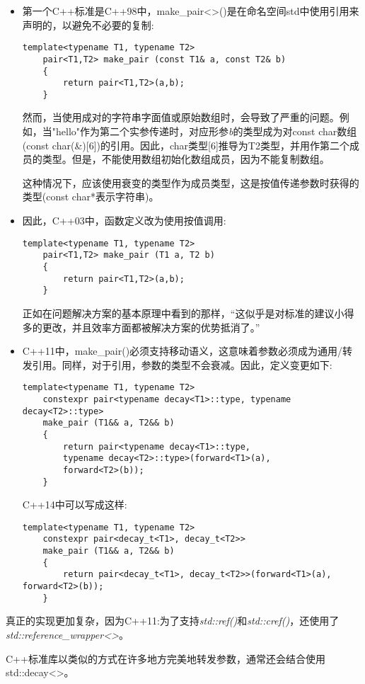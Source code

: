 \begin{itemize}
	\item 第一个C++标准是C++98中，make\_pair<>()是在命名空间std中使用引用来声明的，以避免不必要的复制:
	\begin{lstlisting}[caption={}]
	template<typename T1, typename T2>
	pair<T1,T2> make_pair (const T1& a, const T2& b)
	{
		return pair<T1,T2>(a,b);
	}
	\end{lstlisting}
	然而，当使用成对的字符串字面值或原始数组时，会导致了严重的问题。例如，当"hello"作为第二个实参传递时，对应形参\textit{b}的类型成为对const char数组(const char(\&)[6])的引用。因此，char类型[6]推导为T2类型，并用作第二个成员的类型。但是，不能使用数组初始化数组成员，因为不能复制数组。\par
	这种情况下，应该使用衰变的类型作为成员类型，这是按值传递参数时获得的类型(const char*表示字符串)。
	
	\item 因此，C++03中，函数定义改为使用按值调用:
	\begin{lstlisting}[caption={}]
	template<typename T1, typename T2>
	pair<T1,T2> make_pair (T1 a, T2 b)
	{
		return pair<T1,T2>(a,b);
	}
	\end{lstlisting}
	正如在问题解决方案的基本原理中看到的那样，“这似乎是对标准的建议小得多的更改，并且效率方面都被解决方案的优势抵消了。”
	
	\item C++11中，make\_pair()必须支持移动语义，这意味着参数必须成为通用/转发引用。同样，对于引用，参数的类型不会衰减。因此，定义变更如下:
	\begin{lstlisting}[caption={}]
	template<typename T1, typename T2>
	constexpr pair<typename decay<T1>::type, typename decay<T2>::type>
	make_pair (T1&& a, T2&& b)
	{
		return pair<typename decay<T1>::type,
		typename decay<T2>::type>(forward<T1>(a),
		forward<T2>(b));
	}
	\end{lstlisting}
	C++14中可以写成这样:
	\begin{lstlisting}[caption={}]
	template<typename T1, typename T2>
	constexpr pair<decay_t<T1>, decay_t<T2>>
	make_pair (T1&& a, T2&& b)
	{
		return pair<decay_t<T1>, decay_t<T2>>(forward<T1>(a), forward<T2>(b));
	}
	\end{lstlisting}
\end{itemize}

真正的实现更加复杂，因为C++11:为了支持\textit{std::ref()}和\textit{std::cref()}，还使用了\textit{std::reference\_wrapper<>}。\par

C++标准库以类似的方式在许多地方完美地转发参数，通常还会结合使用std::decay<>。\par

